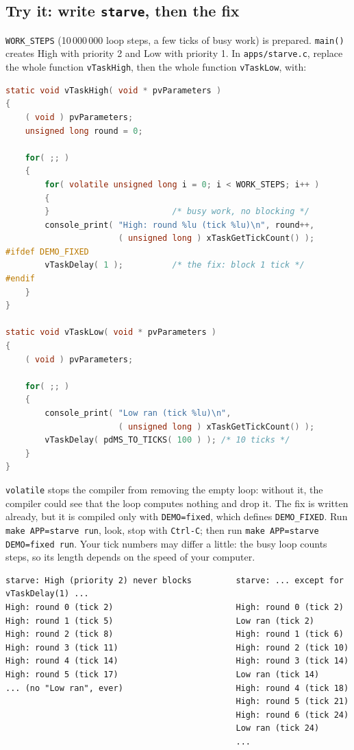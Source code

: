 \subsection{Try it: write \texttt{starve}, then the fix}
\texttt{WORK\_STEPS} (10\,000\,000 loop steps, a few ticks of busy work) is prepared. \texttt{main()} creates High with priority 2 and Low with priority 1. In \texttt{apps/starve.c}, replace the whole function \texttt{vTaskHigh}, then the whole function \texttt{vTaskLow}, with:
\begin{lstlisting}[language=C, showstringspaces=false, basicstyle=\ttfamily\scriptsize]
static void vTaskHigh( void * pvParameters )
{
    ( void ) pvParameters;
    unsigned long round = 0;

    for( ;; )
    {
        for( volatile unsigned long i = 0; i < WORK_STEPS; i++ )
        {
        }                         /* busy work, no blocking */
        console_print( "High: round %lu (tick %lu)\n", round++,
                       ( unsigned long ) xTaskGetTickCount() );
#ifdef DEMO_FIXED
        vTaskDelay( 1 );          /* the fix: block 1 tick */
#endif
    }
}

static void vTaskLow( void * pvParameters )
{
    ( void ) pvParameters;

    for( ;; )
    {
        console_print( "Low ran (tick %lu)\n",
                       ( unsigned long ) xTaskGetTickCount() );
        vTaskDelay( pdMS_TO_TICKS( 100 ) ); /* 10 ticks */
    }
}
\end{lstlisting}
\texttt{volatile} stops the compiler from removing the empty loop: without it, the compiler could see that the loop computes nothing and drop it. The fix is written already, but it is compiled only with \texttt{DEMO=fixed}, which defines \texttt{DEMO\_FIXED}. Run \texttt{make APP=starve run}, look, stop with \texttt{Ctrl-C}; then run \texttt{make APP=starve DEMO=fixed run}. Your tick numbers may differ a little: the busy loop counts steps, so its length depends on the speed of your computer.
{\verbatimscriptsize
\begin{verbatim}
starve: High (priority 2) never blocks         starve: ... except for vTaskDelay(1) ...
High: round 0 (tick 2)                         High: round 0 (tick 2)
High: round 1 (tick 5)                         Low ran (tick 2)
High: round 2 (tick 8)                         High: round 1 (tick 6)
High: round 3 (tick 11)                        High: round 2 (tick 10)
High: round 4 (tick 14)                        High: round 3 (tick 14)
High: round 5 (tick 17)                        Low ran (tick 14)
... (no "Low ran", ever)                       High: round 4 (tick 18)
                                               High: round 5 (tick 21)
                                               High: round 6 (tick 24)
                                               Low ran (tick 24)
                                               ...
\end{verbatim}}
